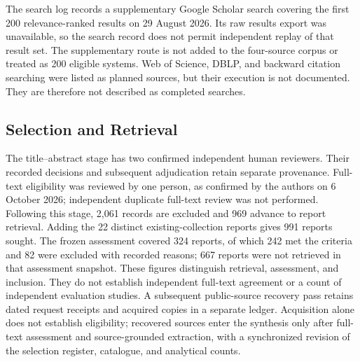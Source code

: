 \documentclass[manuscript,review,screen]{acmart}
\begin{document}
The search log records a supplementary Google Scholar search covering the first 200 relevance-ranked results on 29 August 2026. Its raw results export was unavailable, so the search record does not permit independent replay of that result set. The supplementary route is not added to the four-source corpus or treated as 200 eligible systems. Web of Science, DBLP, and backward citation searching were listed as planned sources, but their execution is not documented. They are therefore not described as completed searches.

\subsection{Selection and Retrieval}
The title--abstract stage has two confirmed independent human reviewers. Their recorded decisions and subsequent adjudication retain separate provenance. Full-text eligibility was reviewed by one person, as confirmed by the authors on 6 October 2026; independent duplicate full-text review was not performed. Following this stage, 2,061 records are excluded and 969 advance to report retrieval. Adding the 22 distinct existing-collection reports gives 991 reports sought. The frozen assessment covered 324 reports, of which 242 met the criteria and 82 were excluded with recorded reasons; 667 reports were not retrieved in that assessment snapshot. These figures distinguish retrieval, assessment, and inclusion. They do not establish independent full-text agreement or a count of independent evaluation studies. A subsequent public-source recovery pass retains dated request receipts and acquired copies in a separate ledger. Acquisition alone does not establish eligibility; recovered sources enter the synthesis only after full-text assessment and source-grounded extraction, with a synchronized revision of the selection register, catalogue, and analytical counts.
\end{document}
